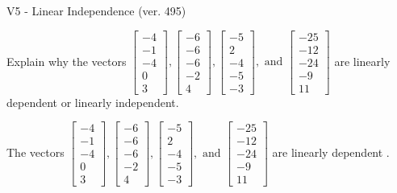 \begin{exercise}
  \begin{exerciseTitle}V5 - Linear Independence (ver. 495)\end{exerciseTitle}
  \begin{exerciseStatement}
    Explain why the vectors \(\left[\begin{array}{r}
-4 \\
-1 \\
-4 \\
0 \\
3
\end{array}\right] , \left[\begin{array}{r}
-6 \\
-6 \\
-6 \\
-2 \\
4
\end{array}\right] , \left[\begin{array}{r}
-5 \\
2 \\
-4 \\
-5 \\
-3
\end{array}\right] , \text{ and } \left[\begin{array}{r}
-25 \\
-12 \\
-24 \\
-9 \\
11
\end{array}\right]\) are linearly dependent or linearly independent.	


  \end{exerciseStatement}
  \begin{exerciseAnswer}
   The vectors \(\left[\begin{array}{r}
-4 \\
-1 \\
-4 \\
0 \\
3
\end{array}\right] , \left[\begin{array}{r}
-6 \\
-6 \\
-6 \\
-2 \\
4
\end{array}\right] , \left[\begin{array}{r}
-5 \\
2 \\
-4 \\
-5 \\
-3
\end{array}\right] , \text{ and } \left[\begin{array}{r}
-25 \\
-12 \\
-24 \\
-9 \\
11
\end{array}\right]\) are 
  	 linearly dependent  .
  


  \end{exerciseAnswer}
\end{exercise}